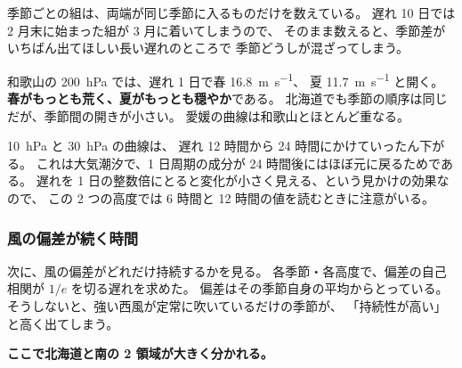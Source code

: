 季節ごとの組は、両端が同じ季節に入るものだけを数えている。
遅れ 10 日では 2 月末に始まった組が 3 月に着いてしまうので、
そのまま数えると、季節差がいちばん出てほしい長い遅れのところで
季節どうしが混ざってしまう。





和歌山の \SI{200}{\hecto\pascal} では、遅れ 1 日で春 \SI{16.8}{\metre\per\second}、
夏 \SI{11.7}{\metre\per\second} と開く。
\textbf{春がもっとも荒く、夏がもっとも穏やか}である。
北海道でも季節の順序は同じだが、季節間の開きが小さい。
愛媛の曲線は和歌山とほとんど重なる。

\SI{10}{\hecto\pascal} と \SI{30}{\hecto\pascal} の曲線は、
遅れ 12 時間から 24 時間にかけていったん下がる。
これは大気潮汐で、1 日周期の成分が 24 時間後にはほぼ元に戻るためである。
遅れを 1 日の整数倍にとると変化が小さく見える、という見かけの効果なので、
この 2 つの高度では 6 時間と 12 時間の値を読むときに注意がいる。

\subsubsection{風の偏差が続く時間}

次に、風の偏差がどれだけ持続するかを見る。
各季節・各高度で、偏差の自己相関が $1/e$ を切る遅れを求めた。
偏差はその季節自身の平均からとっている。
そうしないと、強い西風が定常に吹いているだけの季節が、
「持続性が高い」と高く出てしまう。





\textbf{ここで北海道と南の 2 領域が大きく分かれる。}


